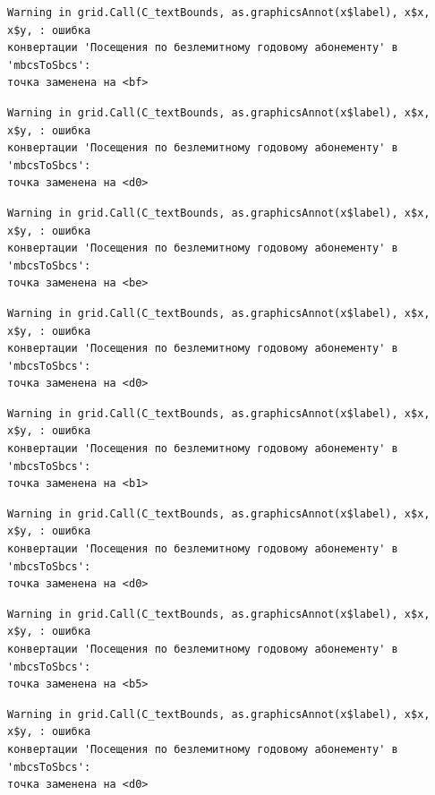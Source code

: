 \documentclass[
  letterpaper,
  DIV=11,
  numbers=noendperiod]{scrreprt}
\begin{document}
\begin{verbatim}
Warning in grid.Call(C_textBounds, as.graphicsAnnot(x$label), x$x, x$y, : ошибка
конвертации 'Посещения по безлемитному годовому абонементу' в 'mbcsToSbcs':
точка заменена на <bf>
\end{verbatim}

\begin{verbatim}
Warning in grid.Call(C_textBounds, as.graphicsAnnot(x$label), x$x, x$y, : ошибка
конвертации 'Посещения по безлемитному годовому абонементу' в 'mbcsToSbcs':
точка заменена на <d0>
\end{verbatim}

\begin{verbatim}
Warning in grid.Call(C_textBounds, as.graphicsAnnot(x$label), x$x, x$y, : ошибка
конвертации 'Посещения по безлемитному годовому абонементу' в 'mbcsToSbcs':
точка заменена на <be>
\end{verbatim}

\begin{verbatim}
Warning in grid.Call(C_textBounds, as.graphicsAnnot(x$label), x$x, x$y, : ошибка
конвертации 'Посещения по безлемитному годовому абонементу' в 'mbcsToSbcs':
точка заменена на <d0>
\end{verbatim}

\begin{verbatim}
Warning in grid.Call(C_textBounds, as.graphicsAnnot(x$label), x$x, x$y, : ошибка
конвертации 'Посещения по безлемитному годовому абонементу' в 'mbcsToSbcs':
точка заменена на <b1>
\end{verbatim}

\begin{verbatim}
Warning in grid.Call(C_textBounds, as.graphicsAnnot(x$label), x$x, x$y, : ошибка
конвертации 'Посещения по безлемитному годовому абонементу' в 'mbcsToSbcs':
точка заменена на <d0>
\end{verbatim}

\begin{verbatim}
Warning in grid.Call(C_textBounds, as.graphicsAnnot(x$label), x$x, x$y, : ошибка
конвертации 'Посещения по безлемитному годовому абонементу' в 'mbcsToSbcs':
точка заменена на <b5>
\end{verbatim}

\begin{verbatim}
Warning in grid.Call(C_textBounds, as.graphicsAnnot(x$label), x$x, x$y, : ошибка
конвертации 'Посещения по безлемитному годовому абонементу' в 'mbcsToSbcs':
точка заменена на <d0>
\end{verbatim}
\end{document}
